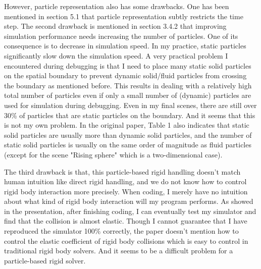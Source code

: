 \documentclass[acmlarge]{acmart}
\begin{document}

However, particle representation 
also has some drawbacks. One has been mentioned in section 5.1 that particle representation subtly 
restricts the time step.
The second drawback is mentioned in section 3.4.2 that improving simulation performance needs increasing the number of particles.
One of its consequence is to decrease in simulation speed.
In my practice, static particles significantly slow down the simulation speed. 
A very practical problem I encountered during debugging is that I need to place many static solid particles on the spatial boundary 
to prevent dynamic solid/fluid particles from crossing the boundary as mentioned before. 
This results in dealing with a relatively high total number of particles even if 
only a small number of (dynamic) particles are used for simulation during debugging. 
Even in my final scenes, there are still over 30\% of particles that are static particles on the boundary. 
And it seems that this is not my own problem. 
In the original paper\cite{2019TOG}, 
Table 1 also indicates that static solid particles are usually more than dynamic solid particles, 
and the number of static solid particles is usually on the same order of magnitude as fluid particles (except for the scene
"Rising sphere" which is a two-dimensional case).

The third drawback is that, this particle-based rigid handling doesn't match human intuition like direct rigid handling, and we 
do not know how to control rigid body interaction more precisely.
When coding, I merely have no intuition about what kind of rigid body interaction will my program performs.
As showed in the presentation, after finishing coding, I can eventually test my simulator and find that the collision
is almost elastic. Though I cannot guarantee that I have reproduced the simulator 100\% correctly, 
the paper doesn't mention how to control the elastic coefficient of rigid body collisions which is 
easy to control in traditional rigid body solvers. And it seems to be a difficult problem for a particle-based rigid solver.
\end{document}

